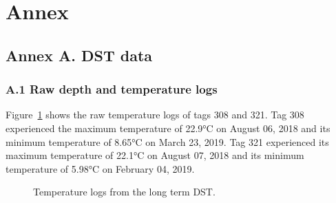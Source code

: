 \documentclass[
  authoryear,
  review,
  3p]{elsarticle}
\begin{document}
\hypertarget{annex}{%
\section*{Annex}\label{annex}}

\hypertarget{annex-a.-dst-data}{%
\subsection*{\texorpdfstring{\textbf{Annex A.} DST
data}{Annex A. DST data}}\label{annex-a.-dst-data}}

\hypertarget{a.1-raw-depth-and-temperature-logs}{%
\subsubsection*{\texorpdfstring{\textbf{A.1} Raw depth and temperature
logs}{A.1 Raw depth and temperature logs}}\label{a.1-raw-depth-and-temperature-logs}}

Figure~\ref{fig-dsttempannex} shows the raw temperature logs of tags 308
and 321. Tag 308 experienced the maximum temperature of 22.9°C on August
06, 2018 and its minimum temperature of 8.65°C on March 23, 2019. Tag
321 experienced its maximum temperature of 22.1°C on August 07, 2018 and
its minimum temperature of 5.98°C on February 04, 2019.

\begin{figure}

\begin{minipage}[t]{\linewidth}

{\centering 


}

\end{minipage}%
\newline
\begin{minipage}[t]{\linewidth}

{\centering 


}

\end{minipage}%

\caption{\label{fig-dsttempannex}Temperature logs from the long term
DST.}

\end{figure}
\end{document}
